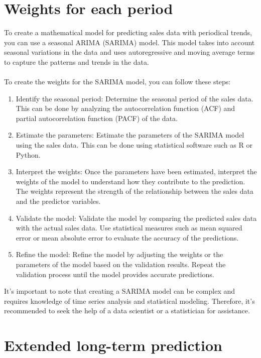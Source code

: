     \section{Weights for each period} \label{sec:weights}
    To create a mathematical model for predicting sales data with periodical trends, you can use a seasonal ARIMA (SARIMA) model.
    This model takes into account seasonal variations in the data and uses autoregressive and moving average terms to capture the
    patterns and trends in the data.\\
    \\
    To create the weights for the SARIMA model, you can follow these steps:
    \begin{enumerate}
        \item Identify the seasonal period: Determine the seasonal period of the sales data. This can be done by analyzing the autocorrelation function (ACF) and partial autocorrelation function (PACF) of the data.
        \item Estimate the parameters: Estimate the parameters of the SARIMA model using the sales data. This can be done using statistical software such as R or Python.
        \item Interpret the weights: Once the parameters have been estimated, interpret the weights of the model to understand how they contribute to the prediction. The weights represent the strength of the relationship between the sales data and the predictor variables.
        \item Validate the model: Validate the model by comparing the predicted sales data with the actual sales data. Use statistical measures such as mean squared error or mean absolute error to evaluate the accuracy of the predictions.
        \item Refine the model: Refine the model by adjusting the weights or the parameters of the model based on the validation results. Repeat the validation process until the model provides accurate predictions.
    \end{enumerate}
    It's important to note that creating a SARIMA model can be complex and requires knowledge of time series analysis and statistical modeling.
    Therefore, it's recommended to seek the help of a data scientist or a statistician for assistance.
    \section{Extended long-term prediction} \label{sec:extlonglp}
